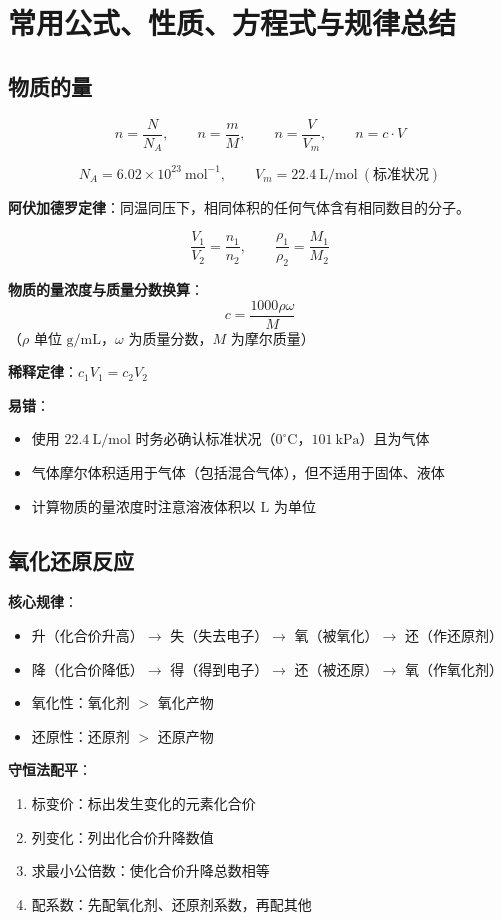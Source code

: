 \section{常用公式、性质、方程式与规律总结}

\subsection{物质的量}

\[
n = \frac{N}{N_A},\qquad n = \frac{m}{M},\qquad n = \frac{V}{V_m},\qquad n = c\cdot V
\]

\[
N_A = 6.02\times 10^{23}\ \text{mol}^{-1},\qquad V_m = 22.4\ \text{L/mol}\ (\text{标准状况})
\]

\textbf{阿伏加德罗定律}：同温同压下，相同体积的任何气体含有相同数目的分子。

\[
\frac{V_1}{V_2} = \frac{n_1}{n_2},\qquad \frac{\rho_1}{\rho_2} = \frac{M_1}{M_2}
\]

\textbf{物质的量浓度与质量分数换算}：
\[
c = \frac{1000\rho\omega}{M}
\]
（$\rho$ 单位 $\text{g/mL}$，$\omega$ 为质量分数，$M$ 为摩尔质量）

\textbf{稀释定律}：$c_1V_1 = c_2V_2$

\textbf{易错}：
\begin{itemize}
  \item 使用 $22.4\ \text{L/mol}$ 时务必确认标准状况（$0^\circ\text{C}$，$101\ \text{kPa}$）且为气体
  \item 气体摩尔体积适用于气体（包括混合气体），但不适用于固体、液体
  \item 计算物质的量浓度时注意溶液体积以 $\text{L}$ 为单位
\end{itemize}

\subsection{氧化还原反应}

\textbf{核心规律}：
\begin{itemize}
  \item 升（化合价升高）$\to$ 失（失去电子）$\to$ 氧（被氧化）$\to$ 还（作还原剂）
  \item 降（化合价降低）$\to$ 得（得到电子）$\to$ 还（被还原）$\to$ 氧（作氧化剂）
  \item 氧化性：氧化剂 $>$ 氧化产物
  \item 还原性：还原剂 $>$ 还原产物
\end{itemize}

\textbf{守恒法配平}：
\begin{enumerate}
  \item 标变价：标出发生变化的元素化合价
  \item 列变化：列出化合价升降数值
  \item 求最小公倍数：使化合价升降总数相等
  \item 配系数：先配氧化剂、还原剂系数，再配其他
\end{enumerate}

